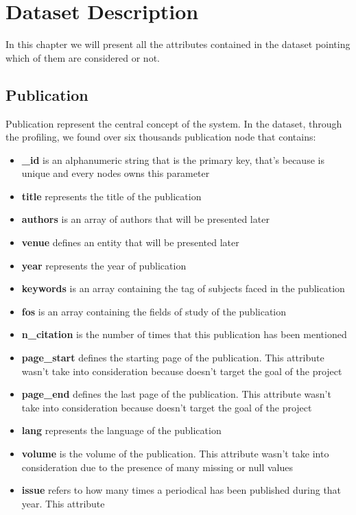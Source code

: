 \documentclass{Configuration_Files/PoliMi3i_thesis}
\begin{document}
\chapter{Dataset Description}
In this chapter we will present all the attributes contained in the dataset pointing which of them are considered or not.

\section{Publication}
Publication represent the central concept of the system. In the dataset, through the profiling, we found over six thousands
publication node that contains:
\begin{itemize}
    \item \textbf{\_id} is an alphanumeric string that is the primary key, that's because is unique and every
            nodes owns this parameter
    \item \textbf{title} represents the title of the publication
    \item \textbf{authors} is an array of authors that will be presented later
    \item \textbf{venue} defines an entity that will be presented later
    \item \textbf{year} represents the year of publication
    \item \textbf{keywords} is an array containing the tag of subjects faced in the publication
    \item \textbf{fos} is an array containing the fields of study of the publication
    \item \textbf{n\_citation} is the number of times that this publication has been mentioned
    \item \textbf{page\_start} defines the starting page of the publication. This attribute wasn't take into consideration
            because doesn't target the goal of the project
    \item \textbf{page\_end} defines the last page of the publication. This attribute wasn't take into consideration
            because doesn't target the goal of the project
    \item \textbf{lang} represents the language of the publication
    \item \textbf{volume} is the volume of the publication. This attribute wasn't take into consideration due to the
            presence of many missing or null values
    \item \textbf{issue} refers to how many times a periodical has been published during that year. This attribute 

\end{itemize}
\end{document}
